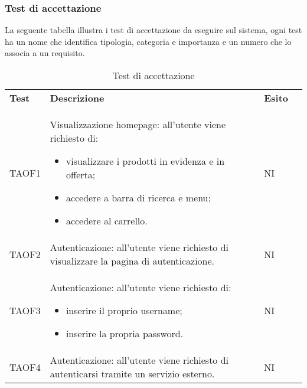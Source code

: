 \subsubsection{Test di accettazione}
La seguente tabella illustra i test di accettazione da eseguire sul sistema, ogni test ha un nome che identifica tipologia, categoria e importanza e un numero che lo associa a un requisito.
\begin{center}
    \centering
    \renewcommand{\arraystretch}{1.8}
    \label{tab:TestAccettazione}
    \begin{longtable}[!h]{p{50px} p{245px} p{75px} p{50px}}
        \caption{Test di accettazione}                                                                                                                                                                                          \\
        \rowcolor{logo!70} \textbf{Test} & \textbf{Descrizione}                                                                                                                                                & \textbf{Esito} \\
        TAOF1                            & Visualizzazione homepage: all'utente viene richiesto di: \begin{itemize} \item visualizzare i prodotti in evidenza e in offerta; \item accedere a barra di ricerca e menu; \item accedere al carrello. \end{itemize}                                                                                  & NI             \\
        TAOF2                            & Autenticazione: all'utente viene richiesto di visualizzare la pagina di autenticazione.                                                                              & NI             \\
        TAOF3                            & Autenticazione: all'utente viene richiesto di: \begin{itemize} \item inserire il proprio username; \item inserire la propria password. \end{itemize}                                                                                            & NI             \\
        TAOF4                            & Autenticazione: all'utente viene richiesto di autenticarsi tramite un servizio esterno.                                                                             & NI             \\

\end{longtable}
\end{center}
